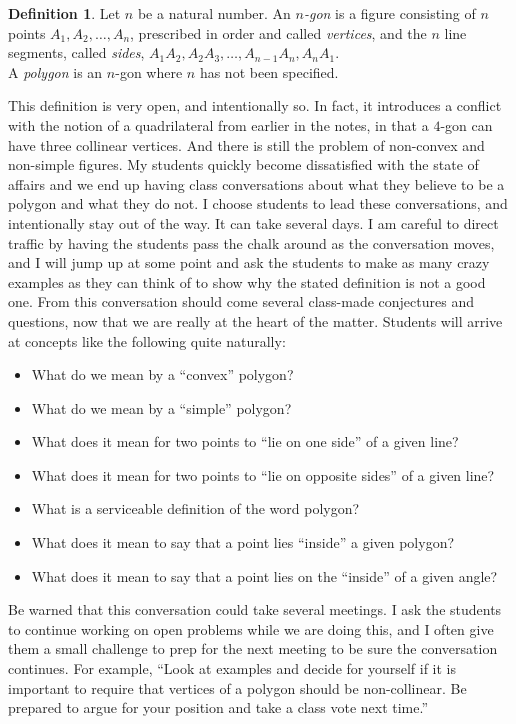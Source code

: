 \documentclass{tufte-handout}
\theoremstyle{definition}
\newtheorem*{definition}{Definition}
\begin{document}
\begin{definition}\label{defn:n-gon}
Let $n$ be a natural number. An \emph{$n$-gon} is a figure consisting of $n$ points $A_1, A_2, \ldots, A_n$, prescribed in order and called \emph{vertices}, and the $n$ line segments, called \emph{sides}, $A_1A_2, A_2A_3, \ldots, A_{n-1}A_n, A_nA_1$.\\
A \emph{polygon} is an $n$-gon where $n$ has not been specified.
\end{definition}

This definition is very open, and intentionally so. In fact, it introduces a conflict with the notion of a quadrilateral from earlier in the notes, in that a $4$-gon can have three collinear vertices. And there is still the problem of non-convex and non-simple figures. My students quickly become dissatisfied with the state of affairs and we end up having class conversations about what they believe to be a polygon and what they do not. I choose students to lead these conversations, and intentionally stay out of the way. It can take several days. I am careful to direct traffic by having the students pass the chalk around as the conversation moves, and I will jump up at some point and ask the students to make as many crazy examples as they can think of to show why the stated definition is not a good one. From this conversation should come several class-made conjectures and questions, now that we are really at the heart of the matter. Students will arrive at concepts like the following quite naturally:\begin{itemize}
\item What do we mean by a ``convex'' polygon?
\item What do we mean by a ``simple'' polygon?
\item What does it mean for two points to ``lie on one side'' of a
given line?
\item What does it mean for two points to ``lie on opposite sides'' of a given line?
\item What is a serviceable definition of the word polygon?
\item What does it mean to say that a point lies ``inside'' a given polygon?
\item What does it mean to say that a point lies on the ``inside'' of a given angle?
\end{itemize}
Be warned that this conversation could take several meetings. I ask the students to continue working on open problems while we are doing this, and I often give them a small challenge to prep for the next meeting to be sure the conversation continues. For example, ``Look at examples and decide for yourself if it is important to require that vertices of a polygon should be non-collinear. Be prepared to argue for your position and take a class vote next time.''
\end{document}
